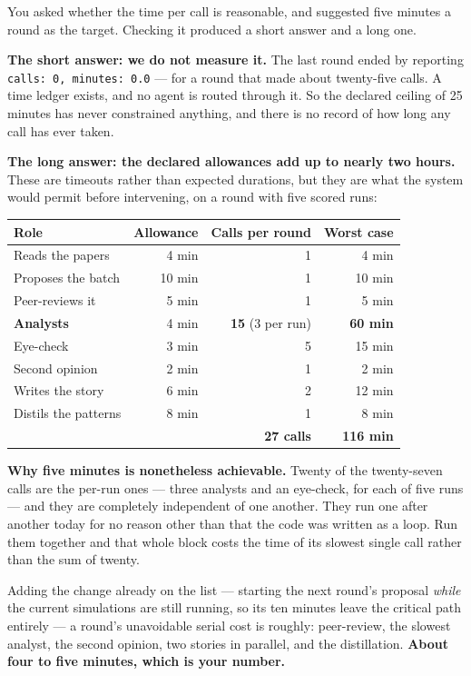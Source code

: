\documentclass[11pt,a4paper]{article}
\begin{document}
You asked whether the time per call is reasonable, and suggested five minutes a round as the
target. Checking it produced a short answer and a long one.

\textbf{The short answer: we do not measure it.} The last round ended by reporting
\texttt{calls: 0, minutes: 0.0} --- for a round that made about twenty-five calls. A time ledger
exists, and no agent is routed through it. So the declared ceiling of 25 minutes has never
constrained anything, and there is no record of how long any call has ever taken.

\textbf{The long answer: the declared allowances add up to nearly two hours.} These are timeouts
rather than expected durations, but they are what the system would permit before intervening, on a
round with five scored runs:

\begin{center}\small
\begin{tabular}{@{}l r r r@{}}
\toprule
\textbf{Role} & \textbf{Allowance} & \textbf{Calls per round} & \textbf{Worst case}\\
\midrule
Reads the papers      & 4 min  & 1  & 4 min\\
Proposes the batch    & 10 min & 1  & 10 min\\
Peer-reviews it       & 5 min  & 1  & 5 min\\
\textbf{Analysts}     & 4 min  & \textbf{15} (3 per run) & \textbf{60 min}\\
Eye-check             & 3 min  & 5  & 15 min\\
Second opinion        & 2 min  & 1  & 2 min\\
Writes the story      & 6 min  & 2  & 12 min\\
Distils the patterns  & 8 min  & 1  & 8 min\\
\midrule
& & \textbf{27 calls} & \textbf{116 min}\\
\bottomrule
\end{tabular}
\end{center}

\textbf{Why five minutes is nonetheless achievable.} Twenty of the twenty-seven calls are the
per-run ones --- three analysts and an eye-check, for each of five runs --- and they are completely
independent of one another. They run one after another today for no reason other than that the
code was written as a loop. Run them together and that whole block costs the time of its slowest
single call rather than the sum of twenty.

Adding the change already on the list --- starting the next round's proposal \emph{while} the
current simulations are still running, so its ten minutes leave the critical path entirely --- a
round's unavoidable serial cost is roughly: peer-review, the slowest analyst, the second opinion,
two stories in parallel, and the distillation. \textbf{About four to five minutes, which is your
number.}
\end{document}
